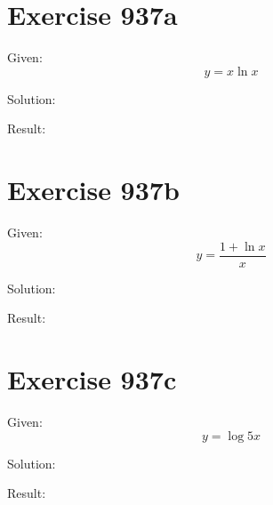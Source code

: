 \documentclass[a4paper, 10pt]{scrartcl}
\begin{document}
\section{Exercise 937a}

Given:
\[
y = x\ln{x}
\]

Solution:

Result:

\section{Exercise 937b}

Given:
\[
y = \frac{1 + \ln{x}}{x}
\]

Solution:

Result:

\section{Exercise 937c}

Given:
\[
y = \log{5x}
\]

Solution:

Result:
\end{document}

